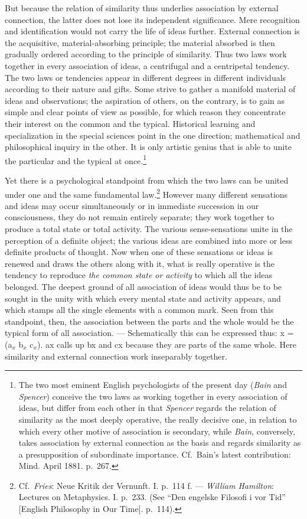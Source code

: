 \documentclass[12pt,a4paper]{book}
\newcommand{\opage}[1]{\marginnote{\footnotesize\textit{[#1]}}}
\begin{document}
But because the relation of similarity thus underlies association by
external connection, the latter does not lose its independent
significance. Mere recognition and identification would not carry the
life of ideas further. External connection is the acquisitive,
material-absorbing principle; the material absorbed is then gradually
ordered according to the principle of similarity.
\opage{193}Thus two laws work together in every association of ideas, a
centrifugal and a centripetal tendency. The two laws or tendencies
appear in different degrees in different individuals according to their
nature and gifts. Some strive to gather a manifold material of ideas and
observations; the aspiration of others, on the contrary, is to gain as
simple and clear points of view as possible, for which reason they
concentrate their interest on the common and the typical. Historical
learning and specialization in the special sciences point in the one
direction; mathematical and philosophical inquiry in the other. It is
only artistic genius that is able to unite the particular and the
typical at once.\footnote{The two most eminent English psychologists of
the present day (\emph{Bain} and \emph{Spencer}) conceive the two laws
as working together in every association of ideas, but differ from each
other in that \emph{Spencer} regards the relation of similarity as the
most deeply operative, the really decisive one, in relation to which
every other motive of association is secondary, while \emph{Bain},
conversely, takes association by external connection as the basis and
regards similarity as a presupposition of subordinate importance. Cf.\
Bain's latest contribution: Mind. April 1881. p.~267.}

Yet there is a psychological standpoint from which the two laws can be
united under one and the same fundamental law.\footnote{Cf.\
\emph{Fries}: Neue Kritik der Vernunft. I. p.~114 f. ---
\emph{William Hamilton}: Lectures on Metaphysics. I. p.~233. (See ``Den
engelske Filosofi i vor Tid'' [English Philosophy in Our Time]. p.~114).}
However many different sensations and ideas may occur simultaneously or
in immediate succession in our consciousness, they do not remain
entirely separate; they work together to produce a total state or total
activity. The various sense-sensations unite in the perception of a
definite object; the various ideas are combined into more or less
definite products of thought. Now when one of these sensations or ideas
is renewed and draws the others along with it, what is really operative
is the tendency to reproduce \emph{the common state or activity} to
which all the ideas belonged. The deepest ground of all association of
ideas would thus be to be sought in the unity with which every mental
state and activity appears,
\opage{194}and which stamps all the single elements with a common mark.
Seen from this standpoint, then, the association between the parts and
the whole would be the typical form of all association. ---
Schematically this can be expressed thus: x = (a$_{x}$ b$_{x}$
c$_{x}$). ax calls up bx and cx because they are parts of the same
whole. Here similarity and external connection work inseparably
together.
\end{document}

